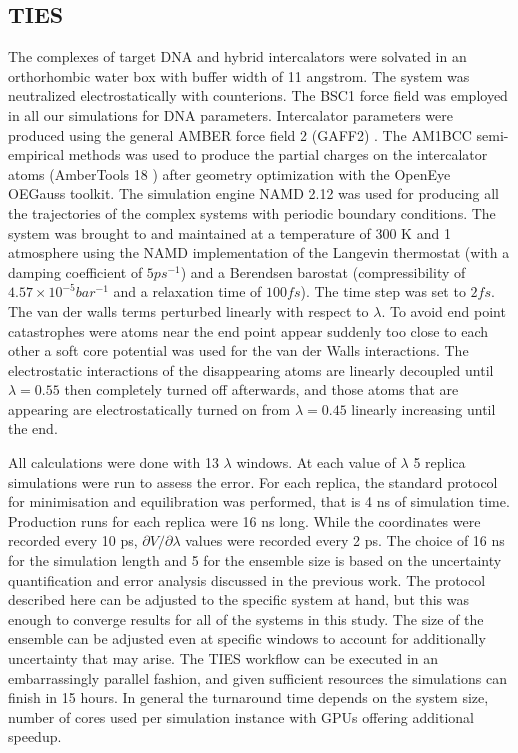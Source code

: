 \subsection{TIES}

The complexes of target DNA and hybrid intercalators were solvated in an orthorhombic water box with buffer width of 11 angstrom. The system was neutralized electrostatically with counterions. The BSC1\cite{ivani2016parmbsc1} force field was employed in all our simulations for DNA parameters. Intercalator parameters were produced using the general AMBER force field 2 (GAFF2) \cite{wang2004development}. The AM1BCC \cite{jakalian2002fast} %
semi-empirical methods was used to produce the partial charges on the intercalator atoms (AmberTools 18 \cite{ambertools18}) after geometry optimization with the OpenEye OEGauss toolkit. The simulation engine NAMD 2.12 was used for producing all the trajectories of the complex systems with periodic boundary conditions. The system was brought to and maintained at a temperature of 300 K and 1 atmosphere using the NAMD implementation of the Langevin thermostat (with a damping coefficient of $5 ps^{-1}$) and a Berendsen barostat (compressibility of $4.57 \times 10^{-5} bar^{-1}$ and a relaxation time of $100 fs$). The time step was set to $2 fs$. The van der walls terms perturbed linearly with respect to $\lambda$. To avoid end point catastrophes were atoms near the end point appear suddenly too close to each other a soft core potential was used for the van der Walls interactions. The electrostatic interactions of the disappearing atoms are linearly decoupled until $\lambda = 0.55$ then completely turned off afterwards, and those atoms that are appearing are electrostatically turned on from $\lambda = 0.45$ linearly increasing until the end.

All calculations were done with 13 $\lambda$ windows. At each value of $\lambda$ 5 replica simulations were run to assess the error. For each replica, the standard protocol for minimisation and equilibration was performed, that is 4 ns of simulation time. Production runs for each replica were 16 ns long. While the coordinates were recorded every 10 ps, $\partial V / \partial \lambda$ values were recorded every 2 ps. The choice of 16 ns for the simulation length and 5 for the ensemble size is based on the uncertainty quantification and error analysis discussed in the previous work. The protocol described here can be adjusted to the specific system at hand, but this was enough to converge results for all of the systems in this study. The size of the ensemble can be adjusted even at specific windows to account for additionally uncertainty that may arise. The TIES workflow can be executed in an embarrassingly parallel fashion, and given sufficient resources the simulations can finish in 15 hours. In general the turnaround time depends on the system size, number of cores used per simulation instance with GPUs offering additional speedup.